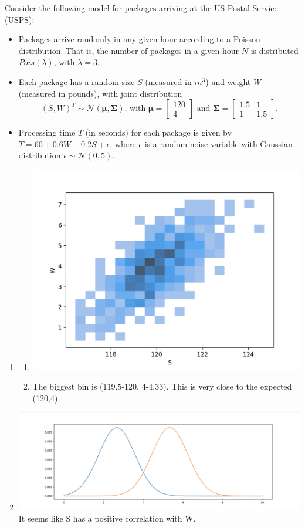 \documentclass{harvardml}
\theoremstyle{definition}
\theoremstyle{plain}
\begin{document}
\begin{solution}
\noindent Consider the following model for packages arriving at the US Postal Service (USPS):
\begin{itemize}
    \item Packages arrive randomly in any given hour according to a Poisson distribution. That is, the number of packages in a given hour $N$ is distributed $Pois(\lambda)$, with $\lambda = 3$.
    \item Each package has a random size $S$ (measured in $in^3$) and weight $W$ (measured in pounds), with joint distribution
    $$(S, W)^{T} \sim \mathcal{N}\left( \boldsymbol{\mu}, \boldsymbol{\Sigma}\right) \text{, with } \boldsymbol{\mu} = \begin{bmatrix} 120 \\ 4 \end{bmatrix} \text{ and } \boldsymbol{\Sigma} = \begin{bmatrix} 1.5 & 1 \\ 1 & 1.5 \end{bmatrix}.$$
    \item Processing time $T$ (in seconds) for each package is given by $T = 60 + 0.6 W + 0.2 S + \epsilon$, where $\epsilon$ is a random noise variable with Gaussian distribution $\epsilon \sim \mathcal{N}(0, 5)$.
\end{itemize}
\begin{enumerate}
    \item
    \begin{enumerate}
        \item \includegraphics[width=0.4\linewidth]{./images/P3Packages.png}
        \item The biggest bin is (119.5-120, 4-4.33). This is very close to the expected (120,4).
    \end{enumerate}
    \item \includegraphics[width=0.4\linewidth]{./images/P3PDF.png} It seems like S has a positive correlation with W.

\end{enumerate}
\end{solution}
\end{document}
